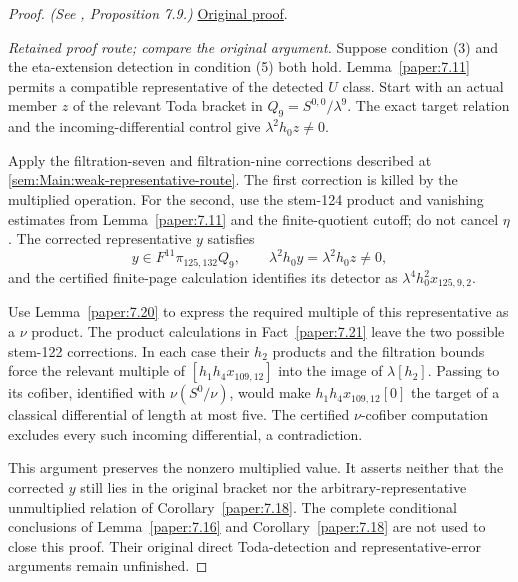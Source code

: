 \begin{proof}
\textit{(See \cite{LWX126}, Proposition 7.9.)} \href{paper/main.tex.html#L2698}{Original proof}.

\textit{Retained proof route; compare the original argument.} Suppose condition (3) and the eta-extension detection in condition (5) both hold. Lemma~\ref{paper:7.11} permits a compatible representative of the detected $U$ class. Start with an actual member $z$ of the relevant Toda bracket in $Q_9=S^{0,0}/\lambda^9$. The exact target relation and the incoming-differential control give $\lambda^2h_0z\ne0$.

Apply the filtration-seven and filtration-nine corrections described at \ref{sem:Main:weak-representative-route}. The first correction is killed by the multiplied operation. For the second, use the stem-124 product and vanishing estimates from Lemma~\ref{paper:7.11} and the finite-quotient cutoff; do not cancel $\eta$. The corrected representative $y$ satisfies
\[
 y\in F^{11}\pi_{125,132}Q_9,\qquad
 \lambda^2h_0y=\lambda^2h_0z\ne0,
\]
and the certified finite-page calculation identifies its detector as $\lambda^4h_0^2x_{125,9,2}$.

Use Lemma~\ref{paper:7.20} to express the required multiple of this representative as a $\nu$ product. The product calculations in Fact~\ref{paper:7.21} leave the two possible stem-122 corrections. In each case their $h_2$ products and the filtration bounds force the relevant multiple of $[h_1h_4x_{109,12}]$ into the image of $\lambda[h_2]$. Passing to its cofiber, identified with $\nu(S^0/\nu)$, would make $h_1h_4x_{109,12}[0]$ the target of a classical differential of length at most five. The certified $\nu$-cofiber computation excludes every such incoming differential, a contradiction.

This argument preserves the nonzero multiplied value. It asserts neither that the corrected $y$ still lies in the original bracket nor the arbitrary-representative unmultiplied relation of Corollary~\ref{paper:7.18}. The complete conditional conclusions of Lemma~\ref{paper:7.16} and Corollary~\ref{paper:7.18} are not used to close this proof. Their original direct Toda-detection and representative-error arguments remain unfinished.
\end{proof}

